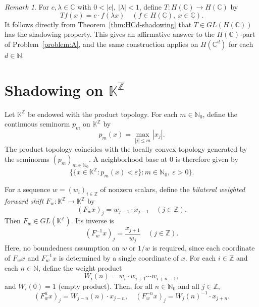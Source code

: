 \documentclass[11pt]{amsart}
\theoremstyle{definition}
\theoremstyle{remark}
\newtheorem{remark}{Remark}
\theoremstyle{plain}
\begin{document}
\begin{remark}
For $c, \lambda\in \mathbb{C}$ with $0<|c|,~ |\lambda|<1$, define
$T: H(\mathbb{C})\to H(\mathbb{C})$ by
\[
Tf(x)=c\cdot f(\lambda x) \quad (f\in H(\mathbb{C}), \ x\in \mathbb{C}).
\]
It follows directly from Theorem~\ref{thm:HCd-shadowing} that
$T\in GL(H(\mathbb{C}))$ has the shadowing property. This gives an
affirmative answer to the \(H(\mathbb{C})\)-part of Problem~\ref{problem:A},
and the same construction applies on
\(H(\mathbb{C}^d)\) for each \(d\in\mathbb{N}\).
\end{remark}

\section[Shadowing on omega(Z)]{Shadowing on \(\mathbb{K}^{\mathbb{Z}}\)}
\label{Sec:omega-shadowing}

Let \(\mathbb{K}^{\mathbb{Z}}\)
be endowed with the product topology. For each \(m\in\mathbb{N}_0\), define
the continuous seminorm \(p_m\) on \(\mathbb{K}^{\mathbb{Z}}\) by
\[
p_m(x)=\max_{|j|\le m}|x_j|.
\]
The product topology coincides with the locally convex topology generated
by the seminorms \((p_m)_{m\in \mathbb{N}_0}\).  A neighborhood base at
\(0\) is therefore given by
\begin{equation}\label{eq:local_base_0}
\{\{x\in\mathbb{K}^{\mathbb{Z}}:p_m(x)<\varepsilon\}:
m\in\mathbb{N}_0,\ \varepsilon>0\}.
\end{equation}

For a sequence \(w=(w_i)_{i\in\mathbb{Z}}\) of nonzero scalars, define the
\textit{bilateral weighted forward shift} \(F_w:\mathbb{K}^{\mathbb{Z}}\to\mathbb{K}^{\mathbb{Z}}\)
by
\begin{equation}\label{eq:Def-bilateral_weighted_forward_shift}
(F_w x)_j=w_{j-1}\cdot x_{j-1}\quad(j\in\mathbb{Z}).
\end{equation}
Then \(F_w\in GL(\mathbb{K}^{\mathbb{Z}})\).  Its inverse is
\[
(F_w^{-1}x)_j=\frac{x_{j+1}}{w_j}\quad(j\in\mathbb{Z}).
\]
Here, no boundedness assumption on \(w\) or \(1/w\) is required, since each coordinate
of \(F_wx\) and \(F_w^{-1}x\) is determined by a single coordinate of \(x\).
For each \(i\in\mathbb{Z}\) and each \(n\in\mathbb{N}\), define the weight product
\[
W_i(n)=w_i\cdot w_{i+1}\cdots w_{i+n-1},
\]
and \(W_i(0)=1\) (empty product).
Then, for all \(n\in\mathbb{N}_0\) and all \(j\in\mathbb{Z}\),
\begin{equation}\label{eq:Iteration_Formula}
(F_w^n x)_j=W_{j-n}(n)\cdot x_{j-n},
\quad
(F_w^{-n}x)_j=W_j(n)^{-1}\cdot x_{j+n}.
\end{equation}
\end{document}
